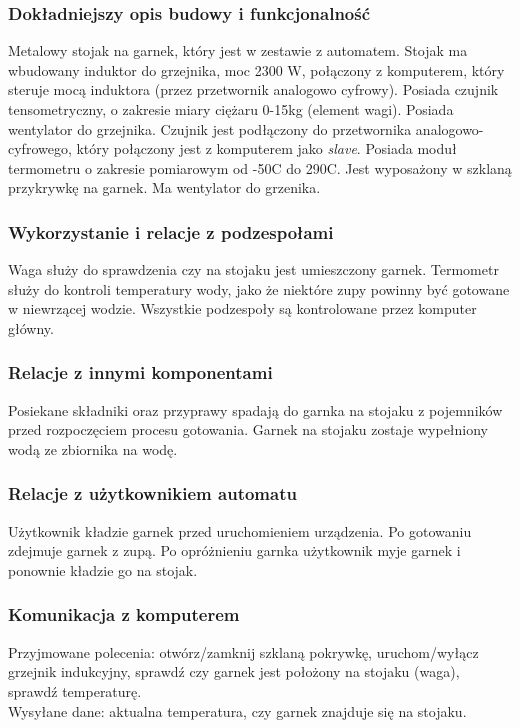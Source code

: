 \documentclass[12pt,a4paper,notitlepage]{report}
\begin{document}
\subsubsection{Dokładniejszy opis budowy i funkcjonalność}
Metalowy stojak na garnek, który jest w zestawie z automatem. Stojak ma wbudowany induktor do grzejnika, moc 2300 W, połączony z komputerem, który steruje mocą induktora (przez przetwornik analogowo cyfrowy). Posiada czujnik tensometryczny, o zakresie miary ciężaru 0-15kg (element wagi). Posiada wentylator do grzejnika. Czujnik jest podłączony do przetwornika analogowo-cyfrowego, który połączony jest z komputerem jako \emph{slave}. Posiada moduł termometru o zakresie pomiarowym od -50\degree C do 290\degree C. Jest wyposażony w szklaną przykrywkę na garnek. Ma wentylator do grzenika.
 
\subsubsection{Wykorzystanie i relacje z podzespołami}
Waga służy do sprawdzenia czy na stojaku jest umieszczony garnek. Termometr służy do kontroli temperatury wody, jako że niektóre zupy powinny być gotowane w niewrzącej wodzie. Wszystkie podzespoły są kontrolowane przez komputer główny.

\subsubsection{Relacje z innymi komponentami}
Posiekane składniki oraz przyprawy spadają do garnka na stojaku z pojemników przed rozpoczęciem procesu gotowania. Garnek na stojaku zostaje wypełniony wodą ze zbiornika na wodę.

\subsubsection{Relacje z użytkownikiem automatu}
Użytkownik kładzie garnek przed uruchomieniem urządzenia. Po gotowaniu zdejmuje garnek z zupą. Po opróżnieniu garnka użytkownik myje garnek i ponownie kładzie go na stojak.

\subsubsection{Komunikacja z komputerem}
Przyjmowane polecenia: otwórz/zamknij szklaną pokrywkę, uruchom/wyłącz grzejnik indukcyjny, sprawdź czy garnek jest położony na stojaku (waga), sprawdź temperaturę.\\
Wysyłane dane: aktualna temperatura, czy garnek znajduje się na stojaku.
\end{document}
